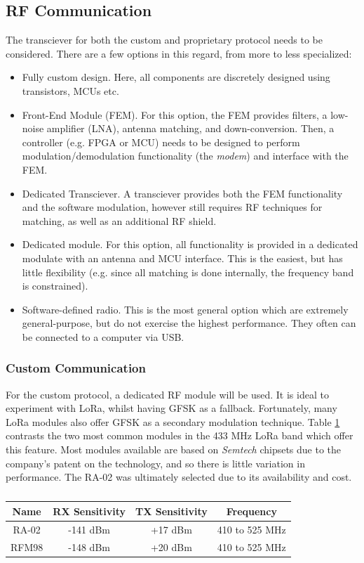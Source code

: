 \subsection{RF Communication}
The transciever for both the custom and proprietary protocol needs to be considered. There are a few options in this regard, from more to less specialized:
\begin{itemize}
    \item Fully custom design. Here, all components are discretely designed using transistors, MCUs etc.
    \item Front-End Module (FEM). For this option, the FEM provides filters, a low-noise amplifier (LNA), antenna matching, and down-conversion. Then, a controller (e.g. FPGA or MCU) needs to be designed to perform modulation/demodulation functionality (the \textit{modem}) and interface with the FEM.
    \item Dedicated Transciever. A transciever provides both the FEM functionality and the software modulation, however still requires RF techniques for matching, as well as an additional RF shield.
    \item Dedicated module. For this option, all functionality is provided in a dedicated modulate with an antenna and MCU interface. This is the easiest, but has little flexibility (e.g. since all matching is done internally, the frequency band is constrained).
    \item Software-defined radio. This is the most general option which are extremely general-purpose, but do not exercise the highest performance. They often can be connected to a computer via USB.
\end{itemize}

\subsubsection{Custom Communication}
For the custom protocol, a dedicated RF module will be used. It is ideal to experiment with LoRa, whilst having GFSK as a fallback. Fortunately, many LoRa modules also offer GFSK as a secondary modulation technique. Table \ref{tab:rfTransceivers} contrasts the two most common modules in the 433 MHz LoRa band which offer this feature. Most modules available are based on \textit{Semtech} chipsets due to the company's patent on the technology, and so there is little variation in performance. The RA-02 was ultimately selected due to its availability and cost.

\begin{table}[!htb]
  \centering
  \renewcommand{\arraystretch}{1.2}
  \begin{tabular}{ |c|c|c|c| }
  \hline
  \textbf{Name}   & \textbf{RX Sensitivity} & \textbf{TX Sensitivity}& \textbf{Frequency} \\
  \hline
  RA-02           & -141 dBm             & +17 dBm              & 410 to 525 MHz     \\
  RFM98           & -148 dBm             & +20 dBm              & 410 to 525 MHz     \\
  \hline
  \end{tabular}
  \caption{}
  \label{tab:rfTransceivers}
\end{table}

